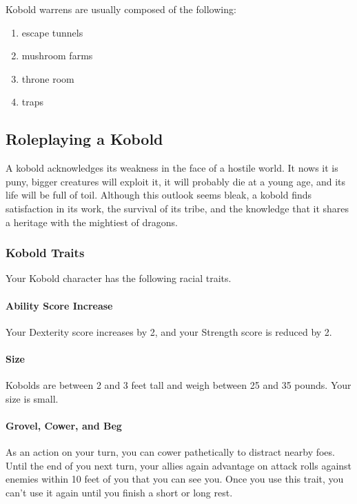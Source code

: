 \documentclass{dm}
\begin{document}
\begin{cols}
    Kobold warrens are usually composed of the following:
    \begin{enumerate}[twocol]
      \item escape tunnels
      \item mushroom farms
      \item throne room
      \item traps
    \end{enumerate}

    \subsection{Roleplaying a Kobold}
    A kobold acknowledges its weakness in the face of a hostile world.
    It nows it is puny, bigger creatures will exploit it, it will probably die at a young age, and its life will be full of toil.
    Although this outlook seems bleak, a kobold finds satisfaction in its work, the survival of its tribe, and the knowledge that it shares a heritage with the mightiest of dragons.

    \subsubsection{Kobold Traits}
    Your Kobold character has the following racial traits.

    \paragraph{Ability Score Increase}
    Your Dexterity score increases by 2, and your Strength score is reduced by 2.

    \paragraph{Size}
    Kobolds are between 2 and 3 feet tall and weigh between 25 and 35 pounds.
    Your size is small.

    \paragraph{Grovel, Cower, and Beg}
    As an action on your turn, you can cower pathetically to distract nearby foes.
    Until the end of you next turn, your allies again advantage on attack rolls against enemies within 10 feet of you that you can see you.
    Once you use this trait, you can't use it again until you finish a short or long rest.


\end{cols}
\end{document}
